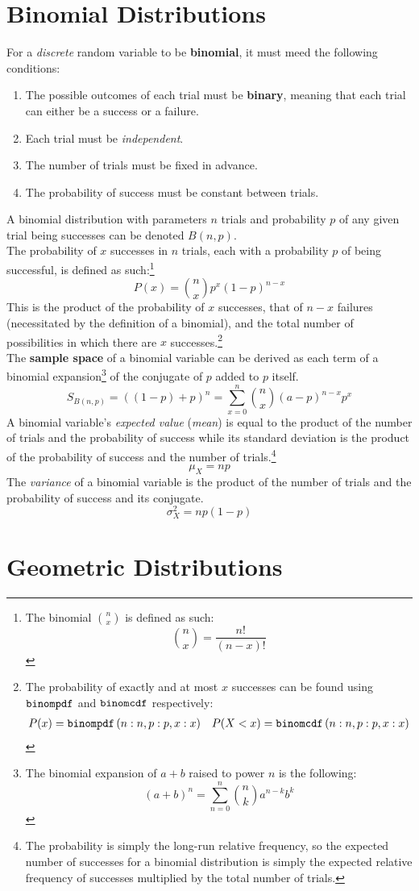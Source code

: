 \documentclass[../AP_Statistics.tex]{subfiles}
\begin{document}
		\section{Binomial Distributions}
			For a \emph{discrete} random variable to be \textbf{binomial}, it must meed the following conditions:
			\begin{enumerate}
				\item
					The possible outcomes of each trial must be \textbf{binary}, meaning that each trial can either be a success or a failure.
				\item
					Each trial must be \emph{independent}.
				\item
					The number of trials must be fixed in advance.
				\item
					The probability of success must be constant between trials.
			\end{enumerate}
			A binomial distribution with parameters $n$ trials and probability $p$ of any given trial being successes can be denoted $B(n, p)$. \\
			The probability of $x$ successes in $n$ trials, each with a probability $p$ of being successful, is defined as such:\footnote{The binomial $\binom{n}{x}$ is defined as such:\[\binom{n}{x} = \frac{n!}{(n - x)!}\]}
			\[P(x) = \binom{n}{x}p^x(1 - p)^{n - x}\]
			This is the product of the probability of $x$ successes, that of $n - x$ failures (necessitated by the definition of a binomial), and the total number of possibilities in which there are $x$ successes.\footnote{The probability of exactly and at most $x$ successes can be found using $\operatorname{\texttt{binompdf}}$ and $\operatorname{\texttt{binomcdf}}$ respectively:\begin{align*}P(x) = \operatorname{\texttt{binompdf}}\left(n:n, p:p, x:x\right) && P(X < x) = \operatorname{\texttt{binomcdf}}\left(n:n, p:p, x:x\right)\end{align*}} \\
			The \textbf{sample space} of a binomial variable can be derived as each term of a binomial expansion\footnote{The binomial expansion of $a + b$ raised to power $n$ is the following:\[(a + b)^n = \sum_{n = 0}^n\binom{n}{k}a^{n - k}b^k\]} of the conjugate of $p$ added to $p$ itself.
			\[S_{B(n, p)} = ((1 - p) + p)^n = \sum_{x = 0}^n\binom{n}{x}(a - p)^{n - x}p^x\]
			A binomial variable's \emph{expected value} (\emph{mean}) is equal to the product of the number of trials and the probability of success while its standard deviation is the product of the probability of success and the number of trials.\footnote{The probability is simply the long-run relative frequency, so the expected number of successes for a binomial distribution is simply the expected relative frequency of successes multiplied by the total number of trials.}
			\[\mu_X = np\]
			The \emph{variance} of a binomial variable is the product of the number of trials and the probability of success and its conjugate.{}
			\[\sigma_X^2 = np(1 - p)\]
		\section{Geometric Distributions}
\end{document}

